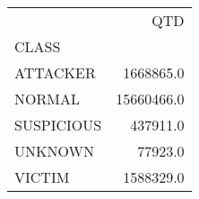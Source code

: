\begin{tabular}{lr}
\toprule
{} &         QTD \\
CLASS      &             \\
\midrule
ATTACKER   &   1668865.0 \\
NORMAL     &  15660466.0 \\
SUSPICIOUS &    437911.0 \\
UNKNOWN    &     77923.0 \\
VICTIM     &   1588329.0 \\
\bottomrule
\end{tabular}
